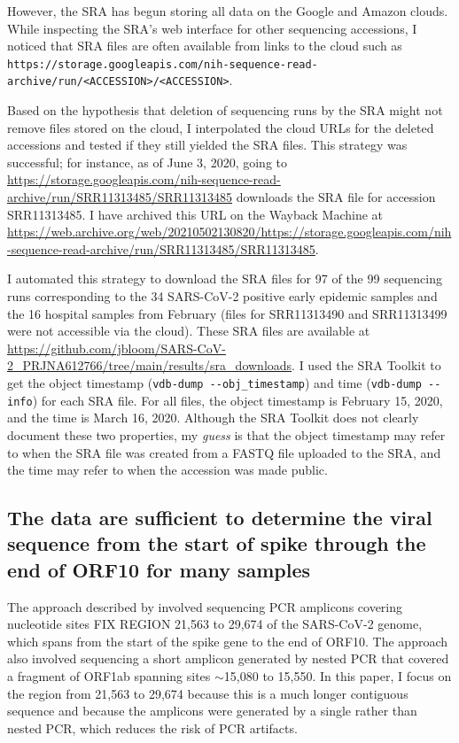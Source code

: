 \documentclass[9pt,twocolumn,twoside]{gsajnl_modified}
\begin{document}
However, the SRA has begun storing all data on the Google and Amazon clouds.
While inspecting the SRA's web interface for other sequencing accessions, I noticed that SRA files are often available from links to the cloud such as \texttt{https://storage.googleapis.com/nih-sequence-read-archive/run/<ACCESSION>/<ACCESSION>}.

Based on the hypothesis that deletion of sequencing runs by the SRA might not remove files stored on the cloud, I interpolated the cloud URLs for the deleted accessions and tested if they still yielded the SRA files.
This strategy was successful; for instance, as of June 3, 2020, going to \url{https://storage.googleapis.com/nih-sequence-read-archive/run/SRR11313485/SRR11313485} downloads the SRA file for accession SRR11313485.
I have archived this URL on the Wayback Machine at \url{https://web.archive.org/web/20210502130820/https://storage.googleapis.com/nih-sequence-read-archive/run/SRR11313485/SRR11313485}.

I automated this strategy to download the SRA files for 97 of the 99 sequencing runs corresponding to the 34 SARS-CoV-2 positive early epidemic samples and the 16 hospital samples from February (files for SRR11313490 and SRR11313499 were not accessible via the cloud).
These SRA files are available at \url{https://github.com/jbloom/SARS-CoV-2_PRJNA612766/tree/main/results/sra_downloads}.
I used the SRA Toolkit to get the object timestamp (\texttt{vdb-dump -{}-obj\_timestamp}) and time (\texttt{vdb-dump -{}-info}) for each SRA file.
For all files, the object timestamp is February 15, 2020, and the time is March 16, 2020.
Although the SRA Toolkit does not clearly document these two properties, my \emph{guess} is that the object timestamp may refer to when the SRA file was created from a FASTQ file uploaded to the SRA, and the time may refer to when the accession was made public.

\subsection{The data are sufficient to determine the viral sequence from the start of spike through the end of ORF10 for many samples}
The approach described by \citet{wang2020medRxiv} involved sequencing PCR amplicons covering nucleotide sites {\color{red} FIX REGION} 21,563 to 29,674 of the SARS-CoV-2 genome, which spans from the start of the spike gene to the end of ORF10.
The approach also involved sequencing a short amplicon generated by nested PCR that covered a fragment of ORF1ab spanning sites $\sim$15,080 to 15,550.
In this paper, I focus on the region from 21,563 to 29,674 because this is a much longer contiguous sequence and because the amplicons were generated by a single rather than nested PCR, which reduces the risk of PCR artifacts.
\end{document}
